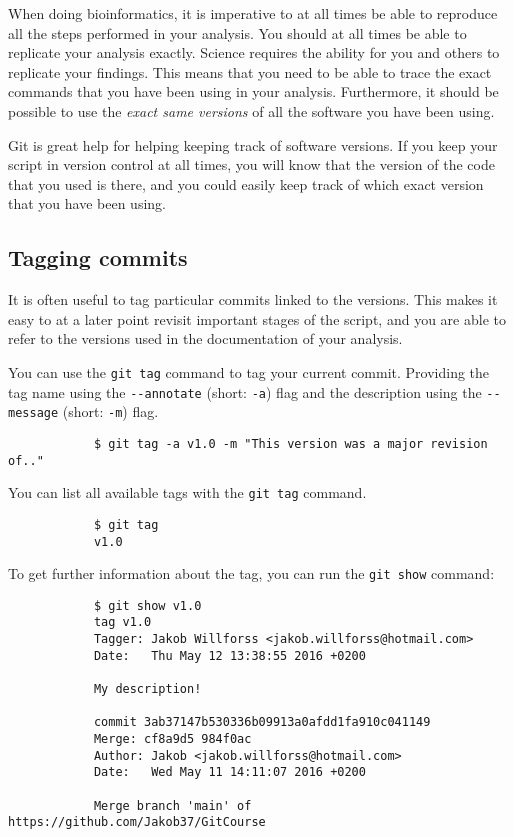 \documentclass[../main/git_course_main.tex]{subfiles}
\begin{document}
	When doing bioinformatics, it is imperative to at all times be able to reproduce all the steps
	performed in your analysis. You should at all times be able to replicate your analysis exactly. Science requires the ability for you and others to replicate your findings.
	This means that you need to be able to trace the exact commands that you have been using in your analysis.
	Furthermore, it should be possible to use the \textit{exact same versions} of all the software you have been using.
	
	Git is great help for helping keeping track of software versions. If you keep your script in version control at all times, you will know that the version
	of the code that you used is there, and you could easily keep track of which exact version that you have been using.
	
	\subsection{Tagging commits}
	
	It is often useful to tag particular
	commits linked to the versions. This makes it easy to at a later point revisit important stages of the script,
	and you are able to refer to the versions used in the documentation of your analysis.
	
	You can use the \verb$git tag$ command to tag your current commit. Providing the tag name using the \verb$--annotate$ (short: \verb$-a$) flag and the description using the \verb$--message$ (short: \verb$-m$) flag.
	
	\begin{codebox}
		\begin{lstlisting}
			$ git tag -a v1.0 -m "This version was a major revision of.."
		\end{lstlisting}
	\end{codebox}
	
	You can list all available tags with the \verb$git tag$ command.
	
	\begin{codebox}
		\begin{lstlisting}
			$ git tag
			v1.0
		\end{lstlisting}
	\end{codebox}
	
	To get further information about the tag, you can run the \verb$git show$ command:
	
	\begin{codebox}
		\begin{lstlisting}
			$ git show v1.0
			tag v1.0
			Tagger: Jakob Willforss <jakob.willforss@hotmail.com>
			Date:   Thu May 12 13:38:55 2016 +0200
			
			My description!
			
			commit 3ab37147b530336b09913a0afdd1fa910c041149
			Merge: cf8a9d5 984f0ac
			Author: Jakob <jakob.willforss@hotmail.com>
			Date:   Wed May 11 14:11:07 2016 +0200
			
			Merge branch 'main' of https://github.com/Jakob37/GitCourse
		\end{lstlisting}
	\end{codebox}
	
\end{document}
